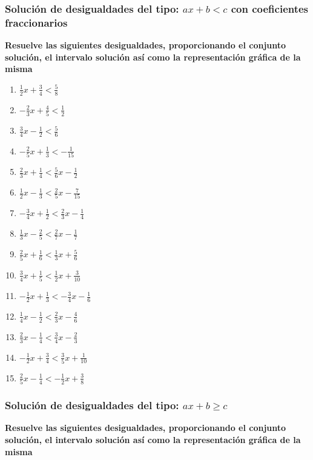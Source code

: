 \documentclass[12pt]{article}
\begin{document}
\subsubsection{Solución de desigualdades del tipo: \(ax+b<c\) con coeficientes fraccionarios}
\textbf{Resuelve las siguientes desigualdades, proporcionando el conjunto solución, el intervalo solución así como la representación gráfica de la misma}

\begin{enumerate}
\def\labelenumi{\arabic{enumi}.}
\item
  \(\frac{1}{2}x+\frac{3}{4}<\frac{5}{8}\)
\item
  \(-\frac{2}{3}x+\frac{4}{5}<\frac{1}{2}\)
\item
  \(\frac{3}{4}x-\frac{1}{2}<\frac{5}{6}\)
\item
  \(-\frac{2}{5}x+\frac{1}{3}<-\frac{1}{15}\)
\item
  \(\frac{2}{3}x+\frac{1}{4}<\frac{5}{6}x-\frac{1}{2}\)
\item
  \(\frac{1}{2}x-\frac{1}{3}<\frac{2}{5}x-\frac{7}{15}\)
\item
  \(-\frac{3}{4}x+\frac{1}{2}<\frac{2}{3}x-\frac{1}{4}\)
\item
  \(\frac{1}{3}x-\frac{2}{5}<\frac{2}{7}x-\frac{1}{7}\)
\item
  \(\frac{2}{5}x+\frac{1}{6}<\frac{1}{3}x+\frac{5}{6}\)
\item
  \(\frac{3}{4}x+\frac{1}{5}<\frac{1}{2}x+\frac{3}{10}\)
\item
  \(-\frac{1}{2}x+\frac{1}{3}<-\frac{3}{4}x-\frac{1}{6}\)
\item
  \(\frac{1}{4}x-\frac{1}{2}<\frac{2}{3}x-\frac{4}{6}\)
\item
  \(\frac{2}{3}x-\frac{1}{4}<\frac{3}{4}x-\frac{2}{3}\)
\item
  \(-\frac{1}{2}x+\frac{3}{4}<\frac{3}{5}x+\frac{1}{10}\)
\item
  \(\frac{2}{5}x-\frac{1}{4}<-\frac{1}{2}x+\frac{3}{8}\)
\end{enumerate}

\subsubsection{Solución de desigualdades del tipo: \(ax+b \geq c\)}

\textbf{Resuelve las siguientes desigualdades, proporcionando el conjunto solución, el intervalo solución así como la representación gráfica de la misma}
\end{document}
